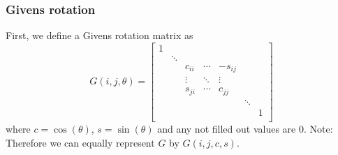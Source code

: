\documentclass[a4paper]{scrartcl}
\begin{document}
        \subsubsection{Givens rotation}
            First, we define a Givens rotation matrix as 
            \begin{equation}\label{eq:Givens}
                G(i,j,\theta) = \begin{bmatrix} 
                    1   &   &   \\
                        &   \ddots&   \\
                        &   & c_{ii} & \cdots& -s_{ij}\\
                        &   & \vdots & \ddots & \vdots\\
                        &   & s_{ji} & \cdots & c_{jj}\\
                        &   &  & & &\ddots\\
                        &   &  & & &&1\\            
                    \end{bmatrix}
            \end{equation}
            where $c=\cos(\theta)$, $s=\sin(\theta)$ and any not filled out values are 0.
            Note: Therefore we can equally represent $G$ by $G(i,j,c,s)$.
        
\end{document}
